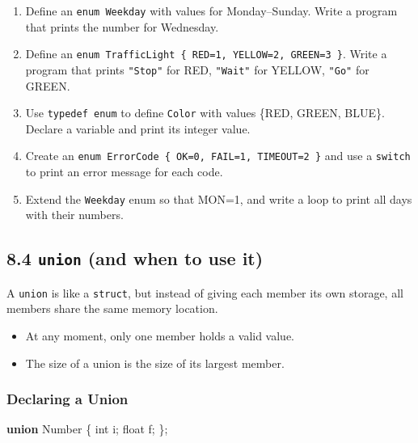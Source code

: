 \documentclass[
  letterpaper,
  DIV=11,
  numbers=noendperiod]{scrreprt}
\newenvironment{Shaded}{\begin{snugshade}}{\end{snugshade}}
\newcommand{\DataTypeTok}[1]{\textcolor[rgb]{0.68,0.00,0.00}{#1}}
\newcommand{\KeywordTok}[1]{\textcolor[rgb]{0.00,0.23,0.31}{\textbf{#1}}}
\newcommand{\NormalTok}[1]{\textcolor[rgb]{0.00,0.23,0.31}{#1}}
\newcommand{\OperatorTok}[1]{\textcolor[rgb]{0.37,0.37,0.37}{#1}}
\providecommand{\tightlist}{%
  \setlength{\itemsep}{0pt}\setlength{\parskip}{0pt}}
\begin{document}
\begin{enumerate}
\def\labelenumi{\arabic{enumi}.}
\tightlist
\item
  Define an \texttt{enum\ Weekday} with values for Monday--Sunday. Write
  a program that prints the number for Wednesday.
\item
  Define an
  \texttt{enum\ TrafficLight\ \{\ RED=1,\ YELLOW=2,\ GREEN=3\ \}}. Write
  a program that prints \texttt{"Stop"} for RED, \texttt{"Wait"} for
  YELLOW, \texttt{"Go"} for GREEN.
\item
  Use \texttt{typedef\ enum} to define \texttt{Color} with values \{RED,
  GREEN, BLUE\}. Declare a variable and print its integer value.
\item
  Create an \texttt{enum\ ErrorCode\ \{\ OK=0,\ FAIL=1,\ TIMEOUT=2\ \}}
  and use a \texttt{switch} to print an error message for each code.
\item
  Extend the \texttt{Weekday} enum so that MON=1, and write a loop to
  print all days with their numbers.
\end{enumerate}

\subsection{\texorpdfstring{8.4 \texttt{union} (and when to use
it)}{8.4 union (and when to use it)}}\label{union-and-when-to-use-it}

A \texttt{union} is like a \texttt{struct}, but instead of giving each
member its own storage, all members share the same memory location.

\begin{itemize}
\tightlist
\item
  At any moment, only one member holds a valid value.
\item
  The size of a union is the size of its largest member.
\end{itemize}

\subsubsection{Declaring a Union}\label{declaring-a-union}

\begin{Shaded}
\begin{Highlighting}[]
\KeywordTok{union}\NormalTok{ Number }\OperatorTok{\{}
    \DataTypeTok{int}\NormalTok{ i}\OperatorTok{;}
    \DataTypeTok{float}\NormalTok{ f}\OperatorTok{;}
\OperatorTok{\};}
\end{Highlighting}
\end{Shaded}
\end{document}
